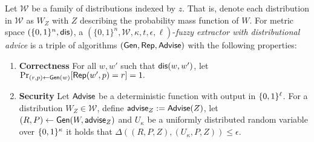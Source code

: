 \begin{definition}
\label{def:fe distributional}
Let $\mathcal{W}$ be a family of distributions indexed by $z$.  That is, denote each distribution in $\mathcal{W}$ as $W_Z$ with $Z$ describing the probability mass function of $W$.  
For metric space $(\{0,1\}^n, \mathsf{dis})$, a $(\{0,1\}^n, \mathcal{W}, \kappa, t, \epsilon, \ell)$-\emph{fuzzy extractor with distributional advice} is a triple of algorithms $({\mathsf{Gen}}, {\mathsf{Rep}}, {\mathsf{Advise}})$ with the following properties:
\begin{enumerate} 
\itemsep0em
\item \textbf{Correctness} For all $w, w'$ such that $\mathsf{dis}(w, w')$, let $\Pr_{(r, p) \leftarrow {\ensuremath{\mathsf{Gen}}}(w)}[{\mathsf{Rep}}(w', p) = r]=1.$
\item \textbf{Security} Let ${\mathsf{Advise}}$ be a deterministic function with output in $\{0, 1\}^\ell$.  For a distribution $W_Z \in \mathcal{W}$, define ${\mathsf{advise}}_Z:= {\mathsf{Advise}}(Z)$, let $(R, P) \leftarrow {\ensuremath{\mathsf{Gen}}}(W, {\mathsf{advise}}_Z)$ and $U_\kappa$ be a uniformly distributed random variable over $\{0, 1\}^\kappa$ it holds that $\Delta((R, P, Z), (U_\kappa, P, Z))\le \epsilon.$
\end{enumerate}
\end{definition}

